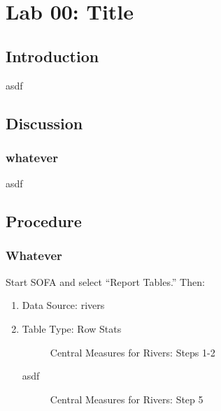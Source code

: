 \chapter{Lab 00: Title}\label{ch:lab00}

\section{Introduction}

asdf 

\section{Discussion}

\subsection{whatever}

asdf


\section{Procedure}

\subsection{Whatever}

Start SOFA and select ``Report Tables.'' Then:

\begin{enumerate}
  \item Data Source: rivers
  \item Table Type: Row Stats

  \begin{figure}[H]
    \begin{center}
      \caption{Central Measures for Rivers: Steps 1-2}
    \end{center}
  \end{figure}

  asdf

  \begin{figure}[H]
    \begin{center}
      \caption{Central Measures for Rivers: Step 5}
    \end{center}
  \end{figure}

\end{enumerate}



